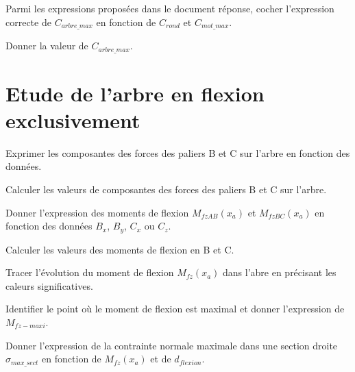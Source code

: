 \documentclass[11pt]{article}
\begin{document}
\UPSTIquestion* Parmi les expressions proposées dans le document réponse, cocher l'expression correcte de $C_{arbre\_max}$ en fonction de $C_{rond}$ et $C_{mot\_max}$.
\begin{UPSTIcorrige}
\end{UPSTIcorrige}

\UPSTIquestion Donner la valeur de $C_{arbre\_max}$.
\begin{UPSTIcorrige}
\end{UPSTIcorrige}


\section{Etude de l'arbre en flexion exclusivement}

\UPSTIquestion* Exprimer les composantes des forces des paliers B et C sur l'arbre en fonction des données.
\begin{UPSTIcorrige}
\end{UPSTIcorrige}

\UPSTIquestion Calculer les valeurs de composantes des forces des paliers B et C sur l'arbre.
\begin{UPSTIcorrige}
\end{UPSTIcorrige}

\UPSTIquestion Donner l'expression des moments de flexion $M_{fzAB}(x_a)$ et $M_{fzBC}(x_a)$ en fonction des données $B_x$, $B_y$, $C_x$ ou $C_z$.
\begin{UPSTIcorrige}
\end{UPSTIcorrige}

\UPSTIquestion Calculer les valeurs des moments de flexion en B et C.
\begin{UPSTIcorrige}
\end{UPSTIcorrige}

\UPSTIquestion Tracer l'évolution du moment de flexion $M_{fz}(x_a)$ dans l'abre en précisant les caleurs significatives. 
\begin{UPSTIcorrige}
\end{UPSTIcorrige}

\UPSTIquestion Identifier le point où le moment de flexion est maximal et donner l'expression de $M_{fz-maxi}$.
\begin{UPSTIcorrige}
\end{UPSTIcorrige}

\UPSTIquestion Donner l'expression de la contrainte normale maximale dans une section droite $\sigma_{max\_sect}$ en fonction de $M_{fz}(x_a)$ et de $d_{flexion}$.
\begin{UPSTIcorrige}
\end{UPSTIcorrige}
\end{document}
